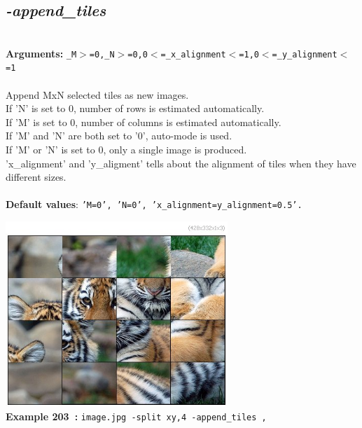 \documentclass[a4paper,11pt,twoside]{book}
\begin{document}
\subsection{\emph{-append\_tiles} }\vspace*{-0.5em}
~\\\textbf{Arguments: } 
{\small \texttt{\_M$>$=0,\_N$>$=0,0$<$=\_x\_alignment$<$=1,0$<$=\_y\_alignment$<$=1}}\\~\\
Append MxN selected tiles as new images.
~\\If 'N' is set to 0, number of rows is estimated automatically.
~\\If 'M' is set to 0, number of columns is estimated automatically.
~\\If 'M' and 'N' are both set to '0', auto-mode is used.
~\\If 'M' or 'N' is set to 0, only a single image is produced.
~\\'x\_alignment' and 'y\_aligment' tells about the alignment of tiles when they have different sizes.
~\\~\\\textbf{Default values}: {\small \texttt{'M=0', 'N=0', 'x\_alignment=y\_alignment=0.5'.}}
\begin{center}\includegraphics[keepaspectratio=true,height=7cm,width=\textwidth]{img/gmic_def203.jpg}\\
{\footnotesize \textbf{Example 203~:} \texttt{image.jpg -split xy,4 -append\_tiles ,}}
\end{center}
\end{document}
